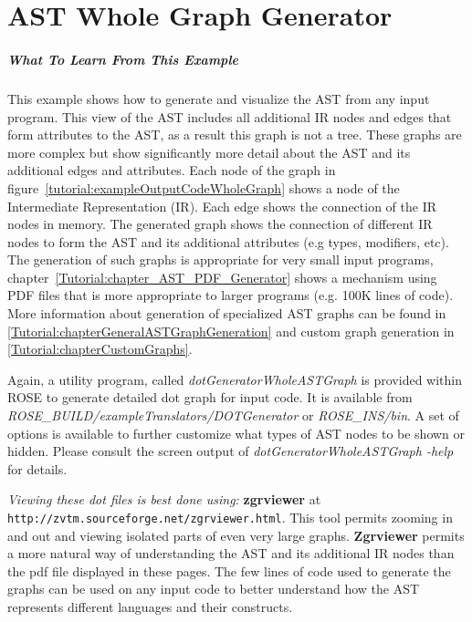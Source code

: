 


\chapter{AST Whole Graph Generator}
\label{Tutorial:chapterASTWholeGraphGenerator}

\paragraph{What To Learn From This Example}
This example shows how to generate and visualize the AST from any input program.
This view of the AST includes all additional IR nodes and edges that form attributes to
the AST, as a result this graph is not a tree.  These graphs are more complex but
show significantly more detail about the AST and its additional edges and attributes.
Each node of the graph in figure~\ref{tutorial:exampleOutputCodeWholeGraph} shows
a node of the Intermediate Representation (IR).  Each edge shows the connection
of the IR nodes in memory. The generated graph shows the connection of different 
IR nodes to form the AST and its additional attributes (e.g types, modifiers, etc).  
The generation of such graphs is appropriate for very small 
input programs, chapter~\ref{Tutorial:chapter_AST_PDF_Generator} shows a mechanism 
using PDF files that is more appropriate to larger programs (e.g. 100K lines of code).
More information about generation of specialized AST graphs can be found in 
\ref{Tutorial:chapterGeneralASTGraphGeneration} and custom graph generation in
\ref{Tutorial:chapterCustomGraphs}.

Again, a utility program, called
\textit{dotGeneratorWholeASTGraph} is provided within ROSE to generate
detailed dot graph for input code. It is available from
\textit{ROSE\_BUILD/exampleTranslators/DOTGenerator} or
\textit{ROSE\_INS/bin}. A set of options is available to further customize
what types of AST nodes to be shown or hidden. Please consult the screen output of
\textit{dotGeneratorWholeASTGraph -help} for details.

   {\em Viewing these dot files is best done using:} {\bf zgrviewer} at 
{\tt http://zvtm.sourceforge.net/zgrviewer.html}.  This tool permits zooming
in and out and viewing isolated parts of even very large graphs. {\bf Zgrviewer} permits 
a more natural way of understanding the AST and its additional IR nodes than the 
pdf file displayed in these pages.  The few lines of code used to generate the
graphs can be used on any input code to better understand how the AST represents
different languages and their constructs.

